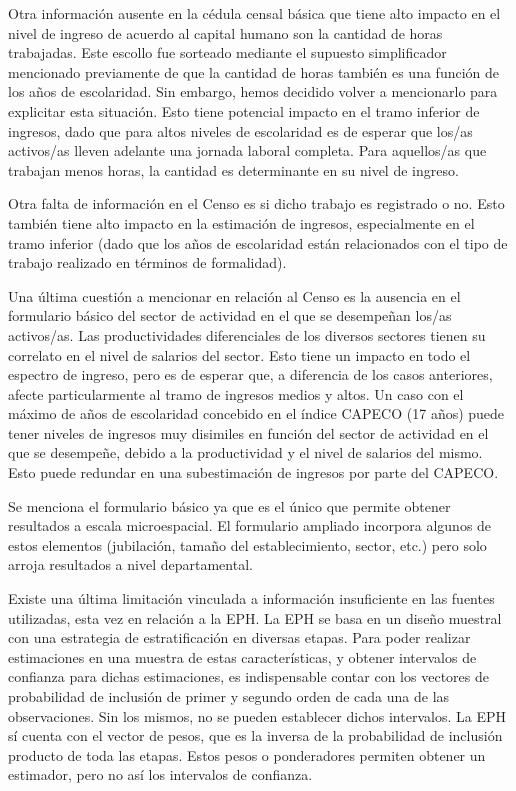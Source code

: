 Otra información ausente en la cédula censal básica que tiene alto impacto en el nivel de ingreso de acuerdo al capital humano son la cantidad de horas trabajadas. Este escollo fue sorteado mediante el supuesto simplificador mencionado previamente de que la cantidad de horas también es una función de los años de escolaridad. Sin embargo, hemos decidido volver a mencionarlo para explicitar esta situación. Esto tiene potencial impacto en el tramo inferior de ingresos, dado que para altos niveles de escolaridad es de esperar que los/as activos/as lleven adelante una jornada laboral completa. Para aquellos/as que trabajan menos horas, la cantidad es determinante en su nivel de ingreso.  

Otra falta de información en el Censo es si dicho trabajo es registrado o no. Esto también tiene alto impacto en la estimación de ingresos, especialmente en el tramo inferior (dado que los años de escolaridad están relacionados con el tipo de trabajo realizado en términos de formalidad). 

Una última cuestión a mencionar en relación al Censo es la ausencia en el formulario básico del sector de actividad en el que se desempeñan los/as activos/as. Las productividades diferenciales de los diversos sectores tienen su correlato en el nivel de salarios del sector. Esto tiene un impacto en todo el espectro de ingreso, pero es de esperar que, a diferencia de los casos anteriores, afecte particularmente al tramo de ingresos medios y altos. Un caso con el máximo de años de escolaridad concebido en el índice CAPECO (17 años) puede tener niveles de ingresos muy disimiles en función del sector de actividad en el que se desempeñe, debido a la productividad y el nivel de salarios del mismo. Esto puede redundar en una subestimación de ingresos por parte del CAPECO. 

Se menciona el formulario básico ya que es el único que permite obtener resultados a escala microespacial. El formulario ampliado incorpora algunos de estos elementos (jubilación, tamaño del establecimiento, sector, etc.) pero solo arroja resultados a nivel departamental.

Existe una última limitación vinculada a información insuficiente en las fuentes utilizadas, esta vez en relación a la EPH. La EPH se basa en un diseño muestral con una estrategia de estratificación en diversas etapas. Para poder realizar estimaciones en una muestra de estas características, y obtener intervalos de confianza para dichas estimaciones, es indispensable contar con los vectores de probabilidad de inclusión de primer y segundo orden de cada una de las observaciones. Sin los mismos, no se pueden establecer dichos intervalos. La EPH sí cuenta con el vector de pesos, que es la inversa de la probabilidad de inclusión producto de toda las etapas. Estos pesos o ponderadores permiten obtener un estimador, pero no así los intervalos de confianza. 


